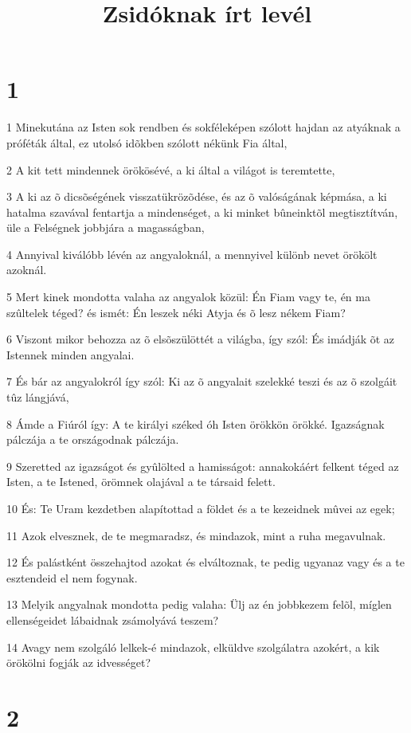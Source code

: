 

\title{Zsidóknak írt levél}


\chapter{1}

\par 1 Minekutána az Isten sok rendben és sokféleképen szólott hajdan az atyáknak a próféták által, ez utolsó idõkben szólott nékünk Fia által,
\par 2 A kit tett mindennek örökösévé, a ki által a világot is teremtette,
\par 3 A ki az õ dicsõségének visszatükrözõdése, és az õ valóságának képmása, a ki hatalma szavával fentartja a mindenséget, a ki minket bûneinktõl megtisztítván,  üle a Felségnek jobbjára a magasságban,
\par 4 Annyival kiválóbb lévén az angyaloknál, a mennyivel különb nevet örökölt azoknál.
\par 5 Mert kinek mondotta valaha az angyalok közül: Én Fiam vagy te, én ma szûltelek téged? és ismét: Én leszek  néki Atyja és õ lesz nékem Fiam?
\par 6 Viszont mikor behozza az õ elsõszülöttét a világba, így szól: És imádják õt az Istennek minden angyalai.
\par 7 És bár az angyalokról így szól: Ki az õ angyalait szelekké teszi és az õ szolgáit tûz lángjává,
\par 8 Ámde a Fiúról így: A te királyi széked óh Isten örökkön örökké. Igazságnak pálczája a te országodnak pálczája.
\par 9 Szeretted az igazságot és gyûlölted a hamisságot: annakokáért felkent téged az Isten, a te Istened, örömnek olajával a te társaid felett.
\par 10 És: Te Uram kezdetben alapítottad a földet és a te kezeidnek mûvei az egek;
\par 11 Azok elvesznek, de te megmaradsz, és mindazok, mint a ruha megavulnak.
\par 12 És palástként összehajtod azokat és elváltoznak, te pedig ugyanaz vagy és a te esztendeid el nem fogynak.
\par 13 Melyik angyalnak mondotta pedig valaha: Ülj az én jobbkezem felõl, míglen ellenségeidet lábaidnak zsámolyává teszem?
\par 14 Avagy nem szolgáló lelkek-é mindazok, elküldve szolgálatra azokért, a kik örökölni fogják az idvességet?

\chapter{2}

